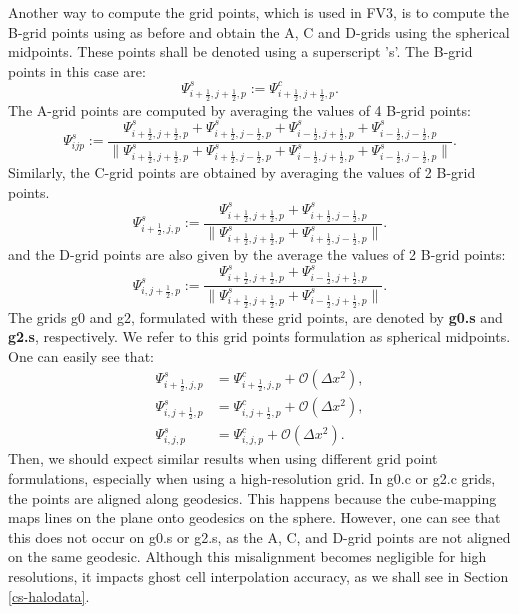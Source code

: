 Another way to compute the grid points, which is used in FV3, is to compute the B-grid
points using as before and obtain the A, C and D-grids using the spherical midpoints.
These points shall be denoted using a superscript 's'.
The B-grid points in this case are:
\begin{equation}
	\Psi_{i+\frac{1}{2},j+\frac{1}{2},p}^s := \Psi_{i+\frac{1}{2},j+\frac{1}{2},p}^c.
\end{equation}
The A-grid points are computed by averaging the values of 4 B-grid points:
\begin{equation}
	\Psi_{ijp}^s :=
	\frac{\Psi_{i+\frac{1}{2},j+\frac{1}{2},p}^s + \Psi_{i+\frac{1}{2},j-\frac{1}{2},p}^s + \Psi_{i-\frac{1}{2},j+\frac{1}{2},p}^s + \Psi_{i-\frac{1}{2},j-\frac{1}{2},p}^s}
         {\|\Psi_{i+\frac{1}{2},j+\frac{1}{2},p}^s + \Psi_{i+\frac{1}{2},j-\frac{1}{2},p}^s + \Psi_{i-\frac{1}{2},j+\frac{1}{2},p}^s + \Psi_{i-\frac{1}{2},j-\frac{1}{2},p}^s\|}.
\end{equation}
Similarly, the C-grid points are obtained by averaging the values of 2 B-grid points.
\begin{equation}
	\Psi_{i+\frac{1}{2},j,p}^s :=
	\frac{\Psi_{i+\frac{1}{2},j+\frac{1}{2},p}^s + \Psi_{i+\frac{1}{2},j-\frac{1}{2},p}^s}
	   {\|\Psi_{i+\frac{1}{2},j+\frac{1}{2},p}^s + \Psi_{i+\frac{1}{2},j-\frac{1}{2},p}^s\|}.
\end{equation}
and the D-grid points are also  given by the average  the values of 2 B-grid points:
\begin{equation}
	\Psi_{i,j+\frac{1}{2},p}^s :=
	\frac{\Psi_{i+\frac{1}{2},j+\frac{1}{2},p}^s + \Psi_{i-\frac{1}{2},j+\frac{1}{2},p}^s}
	     {\|\Psi_{i+\frac{1}{2},j+\frac{1}{2},p}^s + \Psi_{i-\frac{1}{2},j+\frac{1}{2},p}^s\|}.
\end{equation}
The grids g0 and g2, formulated with these grid points, are denoted by \textbf{g0.s} and \textbf{g2.s}, respectively.
We refer to this grid points formulation as spherical midpoints.
One can easily see that:
\begin{align}
	\Psi_{i+\frac{1}{2},j,p}^s &= \Psi_{i+\frac{1}{2},j,p}^c+ \mathcal{O}(\Delta x^2),\\
	\Psi_{i,j+\frac{1}{2},p}^s &= \Psi_{i,j+\frac{1}{2},p}^c+ \mathcal{O}(\Delta x^2),\\
	\Psi_{i,j,p}^s &= \Psi_{i,j,p}^c + \mathcal{O}(\Delta x^2).
\end{align}
Then, we should expect similar results when using different grid point formulations, especially when using a high-resolution grid.
In g0.c or g2.c grids, the points are aligned along geodesics.
This happens because the cube-mapping maps lines on the plane onto geodesics on the sphere.
However, one can see that this does not occur on g0.s or g2.s, as the A, C, and D-grid points are not aligned on the same geodesic.
Although this misalignment becomes negligible for high resolutions,
it impacts ghost cell interpolation accuracy, as we shall see in Section \ref{cs-halodata}.

